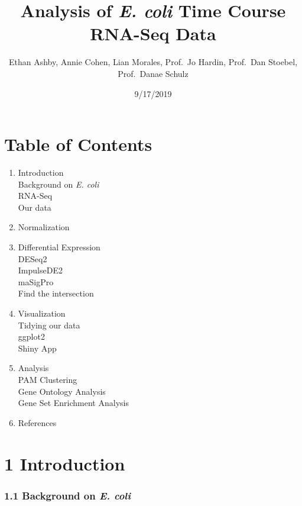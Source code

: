 \documentclass[]{article}
\title{Analysis of \emph{E. coli} Time Course RNA-Seq Data}
\author{Ethan Ashby, Annie Cohen, Lian Morales, Prof.~Jo Hardin, Prof.~Dan
Stoebel, Prof.~Danae Schulz}
\date{9/17/2019}
\providecommand{\tightlist}{%
  \setlength{\itemsep}{0pt}\setlength{\parskip}{0pt}}
\begin{document}
\maketitle

\section{Table of Contents}\label{table-of-contents}

\begin{enumerate}
\def\labelenumi{\arabic{enumi}.}
\tightlist
\item
  Introduction\\
   Background on \emph{E. coli}\\
   RNA-Seq\\
   Our data
\item
  Normalization
\item
  Differential Expression\\
   DESeq2\\
   ImpulseDE2\\
   maSigPro\\
   Find the intersection
\item
  Visualization\\
   Tidying our data\\
   ggplot2\\
   Shiny App
\item
  Analysis\\
   PAM Clustering\\
   Gene Ontology Analysis\\
   Gene Set Enrichment Analysis
\item
  References
\end{enumerate}

\section{\texorpdfstring{\textbf{1}
Introduction}{1 Introduction}}\label{introduction}

\subsubsection{\texorpdfstring{\textbf{1.1} Background on \emph{E.
coli}}{1.1 Background on E. coli}}\label{background-on-e.-coli}
\end{document}

